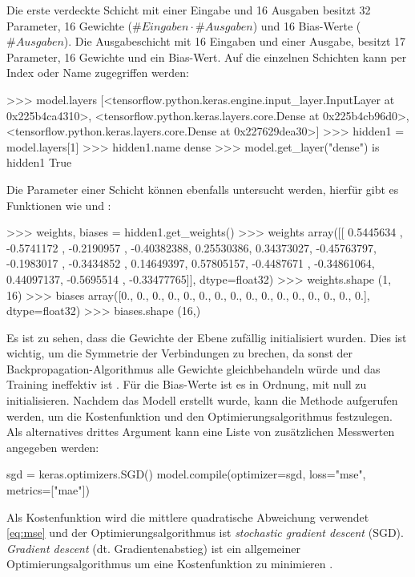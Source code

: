 Die erste verdeckte Schicht mit einer Eingabe und 16 Ausgaben besitzt
32 Parameter, 16 Gewichte ($\#Eingaben \cdot \#Ausgaben$) und 16 Bias-Werte ($\#Ausgaben$).
Die Ausgabeschicht mit 16 Eingaben und einer Ausgabe, besitzt
17 Parameter, 16 Gewichte und ein Bias-Wert.
Auf die einzelnen Schichten kann per Index oder Name zugegriffen werden:
\begin{pyconcode}
>>> model.layers
[<tensorflow.python.keras.engine.input_layer.InputLayer at 0x225b4ca4310>,
 <tensorflow.python.keras.layers.core.Dense at 0x225b4cb96d0>,
 <tensorflow.python.keras.layers.core.Dense at 0x227629dea30>]
>>> hidden1 = model.layers[1]
>>> hidden1.name
dense
>>> model.get_layer("dense") is hidden1
True
\end{pyconcode}
Die Parameter einer Schicht können ebenfalls untersucht werden,
hierfür gibt es Funktionen wie
 und :
\begin{pyconcode}
>>> weights, biases = hidden1.get_weights()
>>> weights
array([[ 0.5445634 , -0.5741172 , -0.2190957 , -0.40382388,  0.25530386,
         0.34373027, -0.45763797, -0.1983017 , -0.3434852 ,  0.14649397,
         0.57805157, -0.4487671 , -0.34861064,  0.44097137, -0.5695514 ,
        -0.33477765]], dtype=float32)
>>> weights.shape
(1, 16)
>>> biases
array([0., 0., 0., 0., 0., 0., 0., 0., 0., 0., 0., 0., 0., 0., 0., 0.],
      dtype=float32)
>>> biases.shape
(16,)
\end{pyconcode}
Es ist zu sehen, dass die Gewichte der Ebene zufällig initialisiert wurden.
Dies ist wichtig, um die Symmetrie der Verbindungen zu brechen,
da sonst der Backpropagation-Algorithmus alle Gewichte gleichbehandeln würde
und das Training ineffektiv ist \parencite[291]{book:hands-on-ml}.
Für die Bias-Werte ist es in Ordnung, mit null zu initialisieren.
Nachdem das Modell erstellt wurde, kann die 
Methode aufgerufen werden, um die Kostenfunktion und den
Optimierungsalgorithmus festzulegen.
Als alternatives drittes Argument kann eine Liste von
zusätzlichen Messwerten angegeben werden:
\begin{pythoncode}
sgd = keras.optimizers.SGD()
model.compile(optimizer=sgd, loss="mse", metrics=["mae"])
\end{pythoncode}
Als Kostenfunktion wird die mittlere quadratische Abweichung verwendet
\eqref{eq:mse} und der Optimierungsalgorithmus ist
\textit{stochastic gradient descent} (SGD). \textit{Gradient descent}
(dt. Gradientenabstieg) ist ein allgemeiner Optimierungsalgorithmus
um eine Kostenfunktion zu minimieren \parencite[118]{book:hands-on-ml}.
